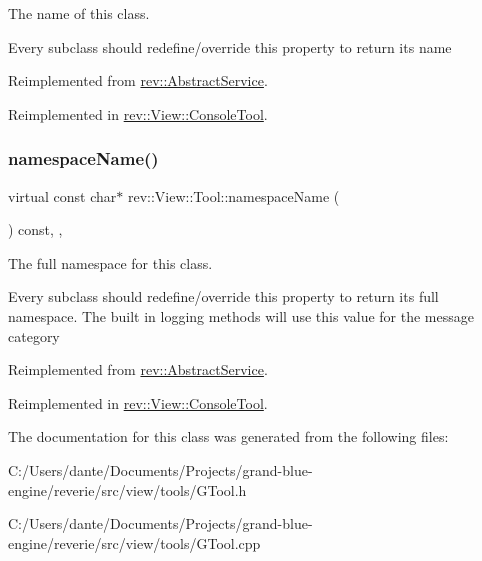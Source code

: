 The name of this class. 

Every subclass should redefine/override this property to return its name 

Reimplemented from \mbox{\hyperlink{classrev_1_1_abstract_service_a0b64ee4651db7637a70265697ca62453}{rev\+::\+Abstract\+Service}}.



Reimplemented in \mbox{\hyperlink{classrev_1_1_view_1_1_console_tool_abffa7bd8ebee59a74578c046ded1fb70}{rev\+::\+View\+::\+Console\+Tool}}.

\mbox{\label{classrev_1_1_view_1_1_tool_ab5359d977478b9c3e30267bcc4e4a853}} 
\subsubsection{\texorpdfstring{namespaceName()}{namespaceName()}}
{\footnotesize\ttfamily virtual const char$\ast$ rev\+::\+View\+::\+Tool\+::namespace\+Name (\begin{DoxyParamCaption}{ }\end{DoxyParamCaption}) const\hspace{0.3cm}{\ttfamily [inline]}, {\ttfamily [override]}, {\ttfamily [virtual]}}



The full namespace for this class. 

Every subclass should redefine/override this property to return its full namespace. The built in logging methods will use this value for the message category 

Reimplemented from \mbox{\hyperlink{classrev_1_1_abstract_service_a062e932eaa2eab0109288f2b32e459f7}{rev\+::\+Abstract\+Service}}.



Reimplemented in \mbox{\hyperlink{classrev_1_1_view_1_1_console_tool_a8168c00a344099bff9626a775408aac4}{rev\+::\+View\+::\+Console\+Tool}}.



The documentation for this class was generated from the following files\+:\begin{DoxyCompactItemize}
\item 
C\+:/\+Users/dante/\+Documents/\+Projects/grand-\/blue-\/engine/reverie/src/view/tools/G\+Tool.\+h\item 
C\+:/\+Users/dante/\+Documents/\+Projects/grand-\/blue-\/engine/reverie/src/view/tools/G\+Tool.\+cpp\end{DoxyCompactItemize}
